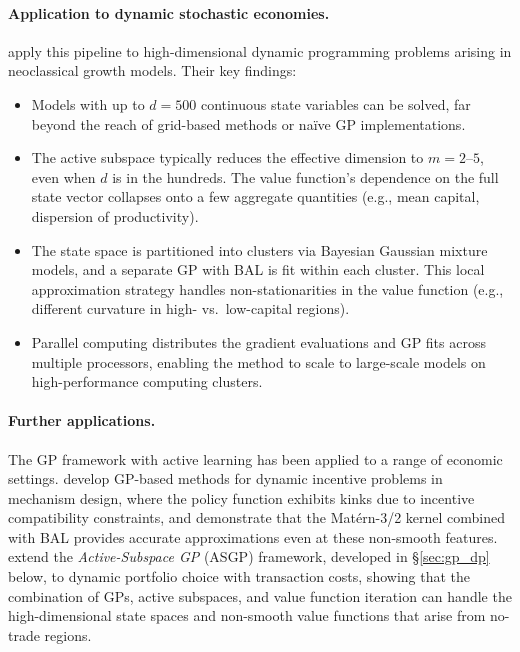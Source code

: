 \documentclass[11pt,a4paper]{report}
\begin{document}
\paragraph{Application to dynamic stochastic economies.}
\citet{SCHEIDEGGER201968} apply this pipeline to high-dimensional dynamic programming problems arising in neoclassical growth models.  Their key findings:
\begin{itemize}[itemsep=2pt]
\item Models with up to $d = 500$ continuous state variables can be solved, far beyond the reach of grid-based methods or na\"ive GP implementations.
\item The active subspace typically reduces the effective dimension to $m = 2$--$5$, even when $d$ is in the hundreds.  The value function's dependence on the full state vector collapses onto a few aggregate quantities (e.g., mean capital, dispersion of productivity).
\item The state space is partitioned into clusters via Bayesian Gaussian mixture models, and a separate GP with BAL is fit within each cluster.  This local approximation strategy handles non-stationarities in the value function (e.g., different curvature in high- vs.\ low-capital regions).
\item Parallel computing distributes the gradient evaluations and GP fits across multiple processors, enabling the method to scale to large-scale models on high-performance computing clusters.
\end{itemize}

\paragraph{Further applications.}  The GP framework with active learning has been applied to a range of economic settings.  \citet{rennerscheidegger_2018} develop GP-based methods for dynamic incentive problems in mechanism design, where the policy function exhibits kinks due to incentive compatibility constraints, and demonstrate that the Mat\'ern-3/2 kernel combined with BAL provides accurate approximations even at these non-smooth features.  \citet{gaegauf2023portfolio} extend the \emph{Active-Subspace GP} (ASGP) framework, developed in \S\ref{sec:gp_dp} below, to dynamic portfolio choice with transaction costs, showing that the combination of GPs, active subspaces, and value function iteration can handle the high-dimensional state spaces and non-smooth value functions that arise from no-trade regions.
\end{document}
